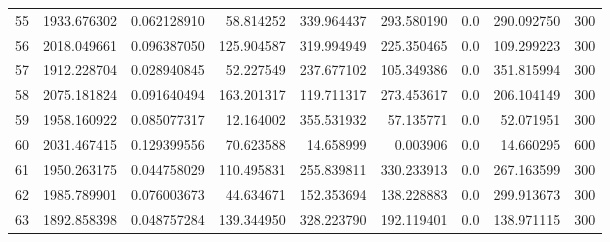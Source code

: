 \begin{longtable}{rrrrrrrrr}
55 & 1933.676302 & 0.062128910 & 58.814252 & 339.964437 & 293.580190 & 0.0 & 290.092750 & 300 \\
56 & 2018.049661 & 0.096387050 & 125.904587 & 319.994949 & 225.350465 & 0.0 & 109.299223 & 300 \\
57 & 1912.228704 & 0.028940845 & 52.227549 & 237.677102 & 105.349386 & 0.0 & 351.815994 & 300 \\
58 & 2075.181824 & 0.091640494 & 163.201317 & 119.711317 & 273.453617 & 0.0 & 206.104149 & 300 \\
59 & 1958.160922 & 0.085077317 & 12.164002 & 355.531932 & 57.135771 & 0.0 & 52.071951 & 300 \\
60 & 2031.467415 & 0.129399556 & 70.623588 & 14.658999 & 0.003906 & 0.0 & 14.660295 & 600 \\
61 & 1950.263175 & 0.044758029 & 110.495831 & 255.839811 & 330.233913 & 0.0 & 267.163599 & 300 \\
62 & 1985.789901 & 0.076003673 & 44.634671 & 152.353694 & 138.228883 & 0.0 & 299.913673 & 300 \\
63 & 1892.858398 & 0.048757284 & 139.344950 & 328.223790 & 192.119401 & 0.0 & 138.971115 & 300 \\
\bottomrule
\end{longtable}
